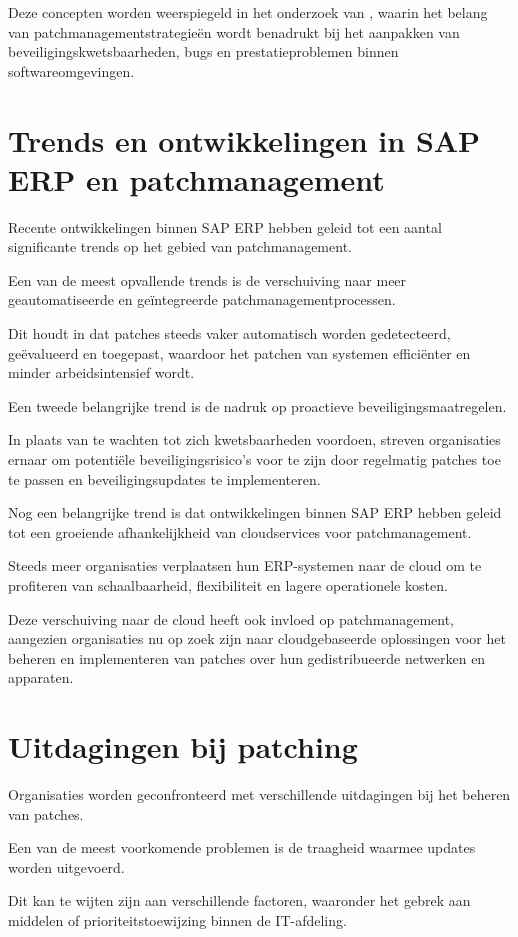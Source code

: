 Deze concepten worden weerspiegeld in het onderzoek van \textcite{Wrobel2023}, waarin het belang van patchmanagementstrategieën wordt benadrukt bij het aanpakken van beveiligingskwetsbaarheden, bugs en prestatieproblemen binnen softwareomgevingen.

\section{Trends en ontwikkelingen in SAP ERP en patchmanagement}
Recente ontwikkelingen binnen SAP ERP hebben geleid tot een aantal significante trends op het gebied van patchmanagement.

Een van de meest opvallende trends is de verschuiving naar meer geautomatiseerde en geïntegreerde patchmanagementprocessen.

Dit houdt in dat patches steeds vaker automatisch worden gedetecteerd, geëvalueerd en toegepast, waardoor het patchen van systemen efficiënter en minder arbeidsintensief wordt.

Een tweede belangrijke trend is de nadruk op proactieve beveiligingsmaatregelen.

In plaats van te wachten tot zich kwetsbaarheden voordoen, streven organisaties ernaar om potentiële beveiligingsrisico's voor te zijn door regelmatig patches toe te passen en beveiligingsupdates te implementeren.

Nog een belangrijke trend is dat ontwikkelingen binnen SAP ERP hebben geleid tot een groeiende afhankelijkheid van cloudservices voor patchmanagement.

Steeds meer organisaties verplaatsen hun ERP-systemen naar de cloud om te profiteren van schaalbaarheid, flexibiliteit en lagere operationele kosten.

Deze verschuiving naar de cloud heeft ook invloed op patchmanagement, aangezien organisaties nu op zoek zijn naar cloudgebaseerde oplossingen voor het beheren en implementeren van patches over hun gedistribueerde netwerken en apparaten.

\section{Uitdagingen bij patching}
Organisaties worden geconfronteerd met verschillende uitdagingen bij het beheren van patches.

Een van de meest voorkomende problemen is de traagheid waarmee updates worden uitgevoerd.

Dit kan te wijten zijn aan verschillende factoren, waaronder het gebrek aan middelen of prioriteitstoewijzing binnen de IT-afdeling.

